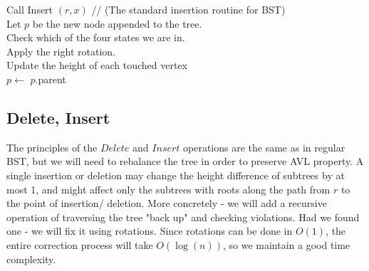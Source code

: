   \begin{algorithm}[H]
    Call Insert $(r,x)$ // (The standard insertion routine for BST) \\  
    Let $p$ be the new node appended to the tree. \\
     {
      Check which of the four states we are in.\\ 
      Apply the right rotation. \\ 
      Update the height of each touched vertex  \\
      $p \leftarrow$ $p$.parent \\  
    }
  \end{algorithm}



\iffalse
\newpage
\subsection{Delete, Insert}
The principles of the $Delete$ and $Insert$ operations are the same as in
regular BST, but we will need to rebalance the tree in order to preserve AVL
property.
A single insertion or deletion may change the height difference of subtrees
by at most 1, and might affect only the subtrees with roots along the path
from $r$ to the point of insertion/ deletion.
More concretely - we will add a recursive operation of traversing the tree
"back up" and checking violations. Had we found one - we will fix it using
rotations. Since rotations can be done in $O(1)$, the entire correction
process will take $O(\log(n))$, so we maintain a good time complexity.

